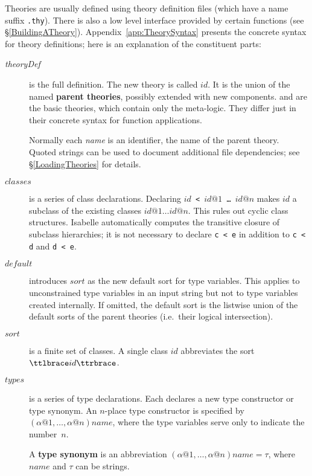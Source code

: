 Theories are usually defined using theory definition files (which have a name
suffix {\tt .thy}). There is also a low level interface provided by certain
\ML{} functions (see \S\ref{BuildingATheory}).
Appendix~\ref{app:TheorySyntax} presents the concrete syntax for theory
definitions; here is an explanation of the constituent parts:
\begin{description}
\item[{\it theoryDef}] is the full definition.  The new theory is
  called $id$.  It is the union of the named {\bf parent
    theories}, possibly extended with new
  components.   and  are the basic theories,
  which contain only the meta-logic. They differ just in their
  concrete syntax for function applications.

  Normally each {\it name\/} is an identifier, the name of the parent theory.
  Quoted strings can be used to document additional file dependencies; see
  \S\ref{LoadingTheories} for details.

\item[$classes$]
  is a series of class declarations.  Declaring {\tt$id$ < $id@1$ \dots\
    $id@n$} makes $id$ a subclass of the existing classes $id@1\dots
  id@n$.  This rules out cyclic class structures.  Isabelle automatically
  computes the transitive closure of subclass hierarchies; it is not
  necessary to declare {\tt c < e} in addition to {\tt c < d} and {\tt d <
    e}.

\item[$default$]
  introduces $sort$ as the new default sort for type variables.  This applies
  to unconstrained type variables in an input string but not to type
  variables created internally.  If omitted, the default sort is the listwise
  union of the default sorts of the parent theories (i.e.\ their logical
  intersection).
  
\item[$sort$] is a finite set of classes.  A single class $id$
  abbreviates the sort $\ttlbrace id\ttrbrace$.

\item[$types$]
  is a series of type declarations.  Each declares a new type constructor
  or type synonym.  An $n$-place type constructor is specified by
  $(\alpha@1,\dots,\alpha@n)name$, where the type variables serve only to
  indicate the number~$n$.

  A {\bf type synonym} is an abbreviation
  $(\alpha@1,\dots,\alpha@n)name = \tau$, where $name$ and $\tau$ can
  be strings.


\end{description}
